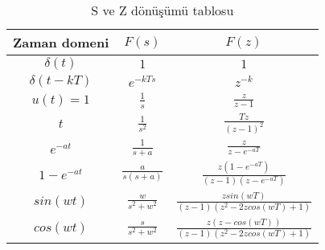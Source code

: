 \begin{table}[!htb]
    \centering
    \caption{S ve Z dönüşümü tablosu}
    \label{tbl:ztransform1}
    \begin{tabular}{ccc}\hline
        Zaman domeni& $F(s)$& $F(z)$\\\hline
        $\delta(t)$& $1$& $1$\\
        $\delta(t-kT)$& $e^{-kTs}$& $z^{-k}$\\
        $u(t)=1$& $\frac{1}{s}$& $\frac{z}{z-1}$\\
        $t$& $\frac{1}{s^2}$& $\frac{Tz}{(z-1)^2}$\\
        $e^{-at}$& $\frac{1}{s+a}$& $\frac{z}{z-e^{-aT}}$\\
        $1-e^{-at}$& $\frac{a}{s(s+a)}$& $\frac{z(1-e^{-aT})}{(z-1)(z-e^{-aT})}$\\
        $sin(wt)$& $\frac{w}{s^2+w^2}$& $\frac{zsin(wT)}{(z-1)(z^2-2zcos(wT)+1)}$\\
        $cos(wt)$& $\frac{s}{s^2+w^2}$& $\frac{z(z-cos(wT))}{(z-1)(z^2-2zcos(wT)+1)}$\\\hline
    \end{tabular}
\end{table}